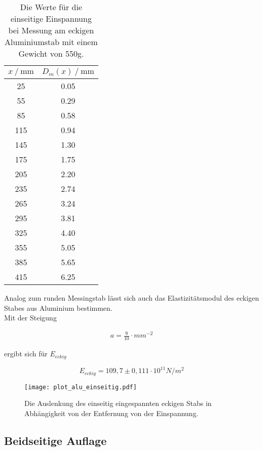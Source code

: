 \begin{table}[H]
  \centering
  \caption{Die Werte für die einseitige Einspannung bei Messung am eckigen Aluminiumstab mit einem Gewicht von 550g.}
  \begin{tabular}{cc}
    \toprule
    {$x \mathbin{/} \unit{\milli\metre}$} &
    {$D_m(x) \mathbin{/} \unit{\milli\metre}$} \\
    \midrule
     25 & 0.05 \\
     55 & 0.29 \\
     85 & 0.58 \\
    115 & 0.94 \\
    145 & 1.30 \\ 
    175 & 1.75 \\
    205 & 2.20 \\    
    235 & 2.74 \\
    265 & 3.24 \\
    295 & 3.81 \\
    325 & 4.40 \\
    355 & 5.05 \\
    385 & 5.65 \\
    415 & 6.25 \\
    
    \bottomrule
  \end{tabular}
  \label{tab:Tabelle4}
\end{table}

Analog zum runden Messingstab lässt sich auch das Elastizitätsmodul des eckigen Stabes aus Aluminium bestimmen.\\
Mit der Steigung 

\begin{align*}
  a = \frac{9}{10} \cdot mm^{-2}
\end{align*}

ergibt sich für $E_{eckig}$ 

\begin{equation*}
  E_{eckig} =  109,7 \pm 0,111 \cdot 10^{11} N/m^2            
\end{equation*}


\begin{figure}[H]
  \centering
  \texttt{[image: plot\_alu\_einseitig.pdf]}
  \caption{Die Auslenkung des einseitig eingespannten eckigen Stabs in Abhängigkeit 
  von der Entfernung von der Einspannung.}
  \label{fig:plot_alu_einseitig}
\end{figure}


\subsection{Beidseitige Auflage}  %
\label{subsec:Beiseitige Auflage}


